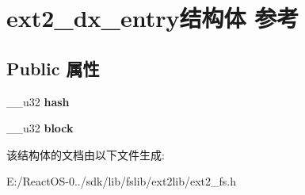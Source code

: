 \hypertarget{structext2__dx__entry}{}\section{ext2\+\_\+dx\+\_\+entry结构体 参考}
\label{structext2__dx__entry}
\subsection*{Public 属性}
\begin{DoxyCompactItemize}
\item 
\mbox{\label{structext2__dx__entry_a73192cd7434641bef9163500d57a6607}} 
\+\_\+\+\_\+u32 {\bfseries hash}
\item 
\mbox{\label{structext2__dx__entry_a2b558104ad93851f3b94293bf1b7ebb1}} 
\+\_\+\+\_\+u32 {\bfseries block}
\end{DoxyCompactItemize}


该结构体的文档由以下文件生成\+:\begin{DoxyCompactItemize}
\item 
E\+:/\+React\+O\+S-\/0../sdk/lib/fslib/ext2lib/ext2\+\_\+fs.\+h\end{DoxyCompactItemize}
